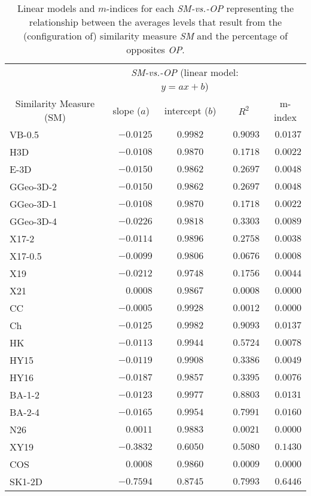 \begin{longtable}[ht]{lrcrr}
\caption{Linear models and $m$-indices for each \emph{SM-vs.-OP} representing the relationship between the averages levels that result from the (configuration of) similarity measure \emph{SM} and the percentage of opposites \emph{OP}.}
\label{tbl:SMs-results}\\
\toprule
& \multicolumn{3}{c}{ \emph{SM-vs.-OP} (linear model: $y=ax+b$)}& \\
\cmidrule(r){2-4}
\multicolumn{1}{c}{Similarity Measure (SM)} & \multicolumn{1}{c}{slope ($a$)} & \multicolumn{1}{c}{intercept ($b$)} & \multicolumn{1}{c}{$R^2$} & \multicolumn{1}{c}{m-index} \\
\midrule
\endhead
\bottomrule
\endfoot

VB-0.5&$-0.0125$&$0.9982$&$0.9093$&$0.0137$\\
H3D&$-0.0108$&$0.9870$&$0.1718$&$0.0022$\\
E-3D&$-0.0150$&$0.9862$&$0.2697$&$0.0048$\\
GGeo-3D-2&$-0.0150$&$0.9862$&$0.2697$&$0.0048$\\
GGeo-3D-1&$-0.0108$&$0.9870$&$0.1718$&$0.0022$\\
GGeo-3D-4&$-0.0226$&$0.9818$&$0.3303$&$0.0089$\\
X17-2&$-0.0114$&$0.9896$&$0.2758$&$0.0038$\\
X17-0.5&$-0.0099$&$0.9806$&$0.0676$&$0.0008$\\
X19&$-0.0212$&$0.9748$&$0.1756$&$0.0044$\\
X21&$0.0008$&$0.9867$&$0.0008$&$0.0000$\\
CC&$-0.0005$&$0.9928$&$0.0012$&$0.0000$\\
Ch&$-0.0125$&$0.9982$&$0.9093$&$0.0137$\\
HK&$-0.0113$&$0.9944$&$0.5724$&$0.0078$\\
HY15&$-0.0119$&$0.9908$&$0.3386$&$0.0049$\\
HY16&$-0.0187$&$0.9857$&$0.3395$&$0.0076$\\
BA-1-2&$-0.0123$&$0.9977$&$0.8803$&$0.0131$\\
BA-2-4&$-0.0165$&$0.9954$&$0.7991$&$0.0160$\\
N26&$0.0011$&$0.9883$&$0.0021$&$0.0000$\\
XY19&$-0.3832$&$0.6050$&$0.5080$&$0.1430$\\
COS&$0.0008$&$0.9860$&$0.0009$&$0.0000$\\
SK1-2D&$-0.7594$&$0.8745$&$0.7993$&$0.6446$\\

\end{longtable}

